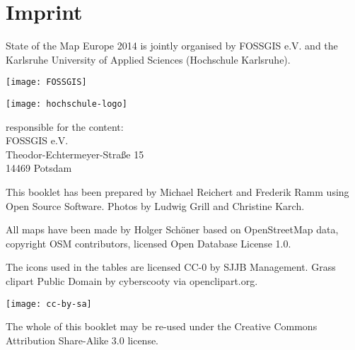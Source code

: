 \newpage
\section*{Imprint}
\label{imprint}

\begin{raggedright}
State of the Map Europe 2014 is jointly organised by FOSSGIS
e.V. and the Karlsruhe University of Applied Sciences
(Hochschule Karlsruhe).

\vspace{0.5em}
 \begin{minipage}[htbp]{0.47\textwidth}
	\texttt{[image: FOSSGIS]}
\end{minipage}
\hfill
\begin{minipage}[hbtp]{0.47\textwidth}
\texttt{[image: hochschule-logo]}
\end{minipage}

\vspace{1.6em}
\noindent responsible for the content:\\
FOSSGIS e.V.\\
Theodor-Echtermeyer-Straße 15\\
14469 Potsdam

\vspace{1em}
\noindent This booklet has been prepared by Michael Reichert and Frederik
Ramm using Open Source Software. Photos by Ludwig Grill and 
Christine Karch.

\vspace{0.5em}

\noindent All maps have been made by Holger Schöner based on Open\-Street\-Map
data, copyright OSM contributors, licensed Open Database License 1.0.

\vspace{0.5em}
\noindent The icons used in the tables are licensed CC-0 by SJJB Management. Grass 
clipart Public Domain by cyberscooty via openclipart.org.


\vspace{1em}
\noindent \begin{minipage}[htbp]{0.2\textwidth}
\noindent\texttt{[image: cc-by-sa]}
\end{minipage}
\hfill
\begin{minipage}[hbtp]{0.74\textwidth}
The whole of this booklet may be re-used under the Creative
Commons Attribution Share-Alike 3.0 license.
\end{minipage}
\end{raggedright}

